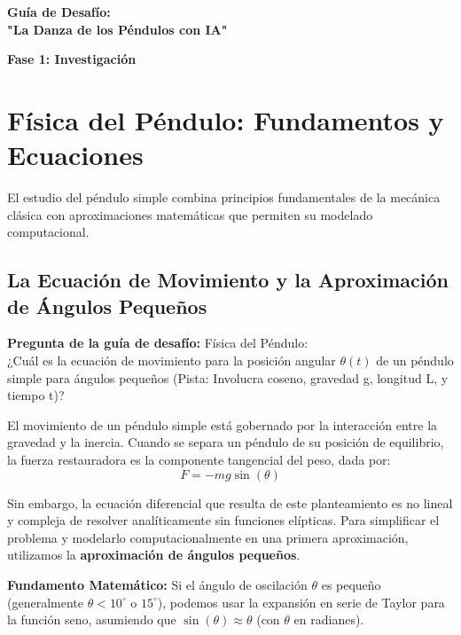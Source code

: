 \documentclass[a4paper,11pt]{article}
\begin{document}
	
	
	
	
	\begin{center}
		\LARGE \textbf{Guía de Desafío: \\ "La Danza de los Péndulos con IA"}
	\end{center}
	\vspace{0.1cm}
	
		\begin{center}
		\LARGE \textbf{Fase 1: Investigación}
	\end{center}
	\vspace{0.1cm}
	
	\section{Física del Péndulo: Fundamentos y Ecuaciones}
	
	El estudio del péndulo simple combina principios fundamentales de la mecánica clásica con aproximaciones matemáticas que permiten su modelado computacional.
	
	\subsection{La Ecuación de Movimiento y la Aproximación de Ángulos Pequeños}
	
	\textbf{Pregunta de la guía de desafío:} Física del Péndulo: \\  ¿Cuál es la ecuación de movimiento para la posición angular $\theta(t)$ de un péndulo simple para ángulos pequeños (Pista: Involucra coseno, gravedad g, longitud L,  y tiempo t)?
	

	El movimiento de un péndulo simple está gobernado por la interacción entre la gravedad y la inercia. Cuando se separa un péndulo de su posición de equilibrio, la fuerza restauradora es la componente tangencial del peso, dada por:
	\begin{equation}
		F = -mg \sin(\theta)
	\end{equation}
	
	Sin embargo, la ecuación diferencial que resulta de este planteamiento es no lineal y compleja de resolver analíticamente sin funciones elípticas. Para simplificar el problema y modelarlo computacionalmente en una primera aproximación, utilizamos la \textbf{aproximación de ángulos pequeños}.
	
	\textbf{Fundamento Matemático:} Si el ángulo de oscilación $\theta$ es pequeño (generalmente $\theta < 10^\circ$ o $15^\circ$), podemos usar la expansión en serie de Taylor para la función seno, asumiendo que $\sin(\theta) \approx \theta$ (con $\theta$ en radianes).
	
\end{document}
